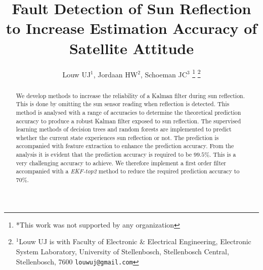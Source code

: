 \documentclass[letterpaper, 10 pt, conference]{ieeeconf}  %
\title{\LARGE \bf
Fault Detection of Sun Reflection to Increase Estimation Accuracy of Satellite Attitude
}
\author{Louw UJ$^{1}$, Jordaan HW$^{2}$, Schoeman JC$^{3}$%
\thanks{*This work was not supported by any organization}%
\thanks{$^{1}$Louw UJ is with Faculty of Electronic \& Electrical Engineering, Electronic System            Laboratory, University of Stellenbosch, Stellenbosch Central, Stellenbosch, 7600
        {\tt\small louwuj@gmail.com}}%
}
\begin{document}
\maketitle
\thispagestyle{empty}
\pagestyle{empty}


\begin{abstract}
	
We develop methods to increase the reliability of a Kalman filter during sun reflection. This is done by omitting the sun sensor reading when reflection is detected. This method is analysed with a range of accuracies to determine the theoretical prediction accuracy to produce a robust Kalman filter exposed to sun reflection. The supervised learning methods of decision trees and random forests are implemented to predict whether the current state experiences sun reflection or not. The prediction is accompanied with feature extraction to enhance the prediction accuracy. From the analysis it is evident that the prediction accuracy is required to be $99.5\%$. This is a very challenging accuracy to achieve. We therefore implement a first order filter accompanied with a \emph{EKF-top2} method to reduce the required prediction accuracy to $70\%$.


\end{abstract}

\end{document}
